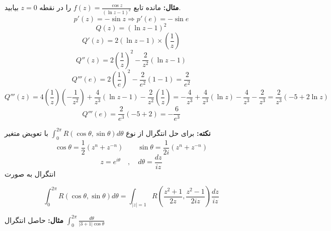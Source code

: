 \documentclass[12pt]{report}
\begin{document}
\textbf{مثال:}
مانده تابع
$f(z) = \frac{\cos z}{(\ln z - 1)^2}$
را در نقطه 
$z = 0$
بیابید.
$$p'(z) = -\sin z \Rightarrow p'(e) = -\sin e$$
$$Q(z) = (\ln z - 1)^2$$
$$Q'(z) = 2(\ln z - 1)\times (\frac{1}{z})$$
$$Q''(z) = 2(\frac{1}{z})^2  - \frac{2}{z^2}(\ln z - 1)$$
$$Q'''(e) = 2(\frac{1}{e})^2 - \frac{2}{e^2}(1 - 1) = \frac{2}{e^2}$$
$$Q'''(z) = 4(\frac{1}{z})(-\frac{1}{z^2}) + \frac{4}{z^3}(\ln z - 1) - \frac{2}{z^2}(\frac{1}{z}) = -\frac{4}{z^3} + \frac{4}{z^3}(\ln z) - \frac{4}{z^3} - \frac{2}{z^3} = \frac{2}{z^3}(-5+ 2\ln z)$$
$$Q'''(e) = \frac{2}{e^3} (-5 + 2) = -\frac{6}{e^3}$$
\newline

\textbf{نکته:}
برای حل انتگرال از نوع 
$\int_{0}^{2\pi} R(\cos  \theta , \sin \theta) d\theta$
با تعویض متغیر
$$\cos \theta = \frac{1}{2}(z^n + z^{-n}) \qquad \sin \theta = \frac{1}{2i}(z^n + z^{-n})$$
$$z = e^{i\theta} \quad , \quad d\theta = \frac{dz}{iz}$$
انتگرال به صورت 

$$\int_{0}^{2\pi} R(\cos  \theta , \sin \theta) d\theta = \int_{|z| =1} R(\frac{z^2 + 1}{2z} , \frac{z^2 - 1}{2iz})\frac{dz}{iz}$$
\newline

\textbf{مثال:}
حاصل انتگرال 
$\int_{0}^{2\pi} \frac{d\theta}{|3 + 1|\cos\theta}$
\end{document}
